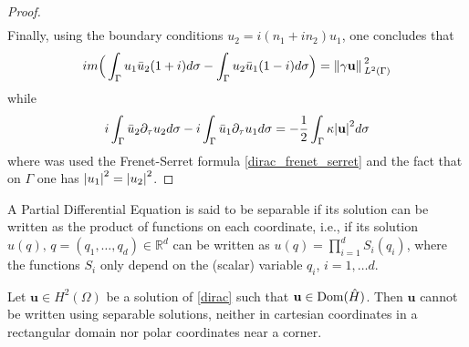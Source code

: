 \begin{proof}
\begin{align*}
    \end{align*}
    Finally, using the boundary conditions \(u_2 = i(n_1 + i n_2)u_1\), one concludes that
    \begin{align*}
    i m \Big(\int_{\Gamma} u_1\bar{u}_2(1+i)d\sigma - \int_{\Gamma} u_2\bar{u}_1(1-i)d\sigma \Big) = \norm*{\gamma \mathbf{u}}_{L^2(\Gamma)}^2
    \end{align*}
    while
    \begin{align*}
    i\int_{\Gamma} \bar{u}_2 \partial_\tau u_2 d \sigma -  i\int_{\Gamma} \bar{u}_1 \partial_\tau u_1 d \sigma = -\frac{1}{2}\int_{\Gamma}\kappa \abs{\mathbf{u}}^2 d\sigma
    \end{align*}
    where was used the Frenet-Serret formula \eqref{dirac_frenet_serret} and the fact that on \(\Gamma\) one has \(\abs{u_1}^2=\abs{u_2}^2\).
\end{proof}

A Partial Differential Equation is said to be separable if its solution can be written as the product of functions on each coordinate, i.e., if its solution \(u(q), \, q=\left(q_1,\dots,q_d\right) \in \mathbb{R}^d\) can be written as \(u(q) = \prod_{i=1}^{d} S_i(q_i)\), where the functions \(S_i\) only depend on the (scalar) variable \(q_i\), \(i=1,\dots d\).

\begin{proposition}\label{dirac_not_polar}
    Let \(\mathbf{u} \in H^2(\Omega)\) be a solution of \eqref{dirac} such that \(\mathbf{u} \in \operatorname{Dom}(\hat{H})\). Then \(\mathbf{u}\) cannot be written using separable solutions, neither in cartesian coordinates in a rectangular domain nor polar coordinates near a corner.
\end{proposition}

